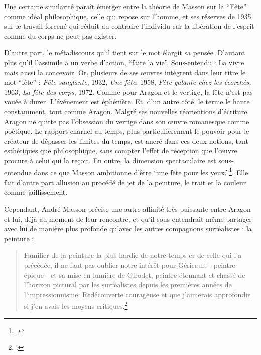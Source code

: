 	Une certaine similarité paraît émerger entre la théorie de Masson sur la \enquote{Fête} comme idéal philosophique, celle qui repose sur l’homme, et ses réserves de 1935 sur le travail forcené qui réduit au contraire l’individu car la libération de l’esprit comme du corps ne peut pas exister. 

	D’autre part, le métadiscours qu’il tient sur le mot élargit sa pensée. D’autant plus qu’il l’assimile à un verbe d’action, \enquote{faire la vie}. Sous-entendu : La vivre mais aussi la concevoir. Or, plusieurs de ses \oe{}uvres intègrent dans leur titre le mot \enquote{fête} : \emph{Fête sanglante}, 1932, \emph{Une fête}, 1958, \emph{Fête galante chez les écorchés,} 1963, \emph{La fête des corps}, 1972. Comme pour Aragon et le vertige, la fête n’est pas vouée à durer. L’événement est éphémère. Et, d’un autre côté, le terme le hante constamment, tout comme Aragon. Malgré ses nouvelles réorientions d’écriture, Aragon ne quitte pas l’obsession du vertige dans son \oe{}uvre romanesque comme poétique. Le rapport charnel au temps, plus particulièrement le pouvoir pour le créateur de dépasser les limites du temps, est ancré dans ces deux notions, tant esthétiques que philosophique, sans compter l’effet de réception que l’\oe{}uvre procure à celui qui la reçoit. En outre, la dimension spectaculaire est sous-entendue dans ce que Masson ambitionne d’être \enquote{une fête pour les yeux.}\footcite{memoiremonde}. Elle fait d’autre part allusion au procédé de jet de la peinture, le trait et la couleur comme jaillissement. 

	Cependant, André Masson précise une autre affinité très puissante entre Aragon et lui, déjà au moment de leur rencontre, et qu’il sous-entendrait même partager avec lui de manière plus profonde qu’avec les autres compagnons surréalistes : la peinture :

	\begin{quote}Familier de la peinture la plus hardie de notre temps er de celle qui l’a précédée, il ne faut pas oublier notre intérêt pour Géricault - peintre épique - et sa mise en lumière de Girodet, peintre étonnant et chassé de l’horizon pictural par les surréalistes depuis les premières années de l’impressionnisme. Redécouverte  courageuse et que j’aimerais approfondir si j’en avais les moyens critiques.\footcite[p85]{rebelle}\end{quote}
	

